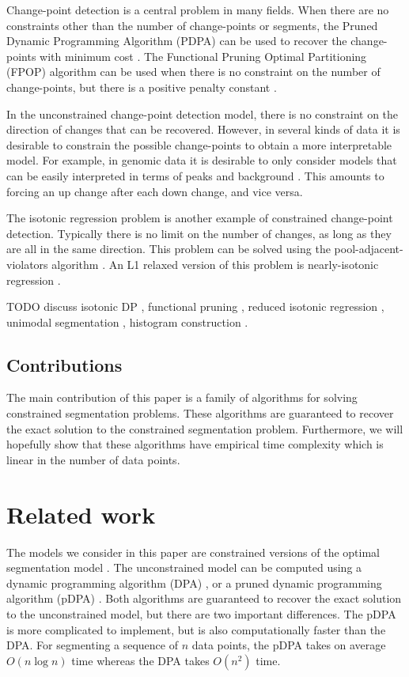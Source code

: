 \documentclass{article}
\begin{document}
Change-point detection is a central problem in many fields. When there
are no constraints other than the number of change-points or segments,
the Pruned Dynamic Programming Algorithm (PDPA) can be used to recover
the change-points with minimum cost \citep{pruned-dp}. The Functional
Pruning Optimal Partitioning (FPOP) algorithm can be used when there
is no constraint on the number of change-points, but there is a
positive penalty constant \citep{FPOP}. 

In the unconstrained change-point detection model, there is no
constraint on the direction of changes that can be recovered. However,
in several kinds of data it is desirable to constrain the possible
change-points to obtain a more interpretable model. For example, in
genomic data it is desirable to only consider models that can be
easily interpreted in terms of peaks and background
\citep{PeakSeg}. This amounts to forcing an up change after each down
change, and vice versa.

The isotonic regression problem is another example of constrained
change-point detection. Typically there is no limit on the number of
changes, as long as they are all in the same direction. This problem
can be solved using the pool-adjacent-violators algorithm
\citep{mair2009isotone}. An L1 relaxed version of this problem is
nearly-isotonic regression \citep{tibshirani2011nearly}.

TODO discuss isotonic DP \citep{isotonic-dp}, functional pruning
\citep{phd-johnson}, reduced isotonic regression
\citep{hardwick2014optimal}, unimodal segmentation
\citep{haiminen2008algorithms}, histogram construction
\citep{halim2009fast}.

\subsection{Contributions}

The main contribution of this paper is a family of algorithms for
solving constrained segmentation problems. These algorithms are
guaranteed to recover the exact solution to the constrained
segmentation problem. Furthermore, we will hopefully show that these algorithms have
empirical time complexity which is linear in the number of data
points.

\section{Related work}
\label{sec:related}

The models we consider in this paper are constrained versions of the
optimal segmentation model \citep{Segmentor}. The
unconstrained model can be computed using a dynamic programming
algorithm (DPA) \citep{bellman}, or a pruned dynamic programming
algorithm (pDPA) \citep{pruned-dp}. Both algorithms are guaranteed to
recover the exact solution to the unconstrained model, but there are
two important differences. The pDPA is more complicated to implement,
but is also computationally faster than the DPA. For segmenting a
sequence of $n$ data points, the pDPA takes on average $O(n\log n)$
time whereas the DPA takes $O(n^2)$ time.
\end{document}
